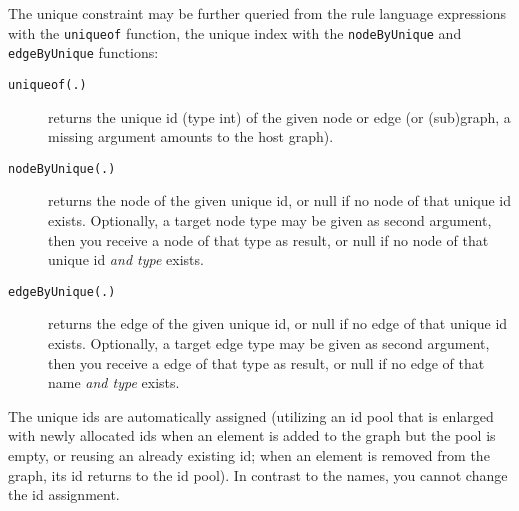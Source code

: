 The unique constraint may be further queried from the rule language expressions with the \texttt{uniqueof} function,
the unique index with the \texttt{nodeByUnique} and \texttt{edgeByUnique} functions:
\begin{description}
\item[\texttt{uniqueof(.)}] returns the unique id (type int) of the given node or edge (or (sub)graph, a missing argument amounts to the host graph).
\item[\texttt{nodeByUnique(.)}] returns the node of the given unique id, or null if no node of that unique id exists. Optionally, a target node type may be given as second argument, then you receive a node of that type as result, or null if no node of that unique id \emph{and type} exists.
\item[\texttt{edgeByUnique(.)}] returns the edge of the given unique id, or null if no edge of that unique id exists. Optionally, a target edge type may be given as second argument, then you receive a edge of that type as result, or null if no edge of that name \emph{and type} exists.
\end{description}

The unique ids are automatically assigned (utilizing an id pool that is enlarged with newly allocated ids when an element is added to the graph but the pool is empty, or reusing an already existing id; when an element is removed from the graph, its id returns to the id pool).
In contrast to the names, you cannot change the id assignment.

